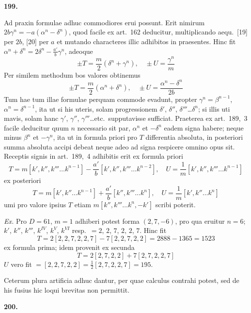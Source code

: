 \documentclass[12pt,a4paper]{article}
\theoremstyle{plain}
\begin{document}
\bigskip

\textbf{199.}

Ad praxin formulae adhuc commodiores erui possunt. Erit nimirum $2b\gamma^n = -a(\alpha^n - \delta^n)$, quod facile ex art.~162 deducitur, multiplicando aequ.~[19] per $2b$, [20] per $a$ et mutando characteres illic adhibitos in praesentes. Hinc fit $\alpha^n + \delta^n = 2\delta^n - \frac{a'}{b}\gamma^n$, adeoque
\[
\pm T = \frac{m}{2}(\delta^n + \gamma^n), \quad \pm U = \frac{\gamma^n}{m}
\]
Per similem methodum bos valores obtinemus
\[
\pm T = \frac{m}{2}(\alpha^n + \delta^n), \quad \pm U = \frac{\alpha^n - \delta^n}{2b}
\]
Tum hae tum illae formulae perquam commode evadunt, propter $\gamma^n = \beta^{n-1}$, $\alpha^n = \delta^{n-1}$, ita ut si his uteris, solam progressionem $\delta'$, $\delta''$, $\delta'''$\ldots$\delta^n$; si illis uti mavis, solam hanc $\gamma'$, $\gamma''$, $\gamma'''$\ldots etc.~supputavisse sufficiat. Praeterea ex art.~189,~3 facile deducitur quum $n$ necessario sit par, $\alpha^n$ et $-\delta^n$ eadem signa habere; neque minus $\beta^n$ et $-\gamma^n$, ita ut in formula priori pro $T$ differentia absoluta, in posteriori summa absoluta accipi debeat neque adeo ad signa respicere omnino opus sit. Receptis signis in art.~189,~4 adhibitis erit ex formula priori
\[
T = m[k', k'', k'''\ldots k^{n-1}] - \frac{a'}{b}[k', k'', k'''\ldots k^{n-2}], \quad U = \frac{1}{m}[k', k'', k'''\ldots k^{n-1}]
\]
ex posteriori
\[
T = m[k', k''\ldots k^{n-1}] + \frac{a'}{b}[k'', k'''\ldots k^n], \quad U = \frac{1}{m}[k', k''\ldots k^n]
\]
umi pro valore ipsius $T$ etiam $m[k'', k'''\ldots k^n, -k']$ scribi poterit.

\textit{Ex.} Pro $D = 61$, $m = 1$ adhiberi potest forma $(2, 7, -6)$, pro qua eruitur $n = 6$; $k'$, $k''$, $k'''$, $k^{IV}$, $k^V$, $k^{VI}$ resp.~$= 2$, $2$, $7$, $2$, $2$, $7$. Hinc fit
\[
T = 2[2, 2, 7, 2, 2, 7] - 7[2, 2, 7, 2, 2] = 2888 - 1365 = 1523
\]
ex formula prima; idem provenit ex secunda
\[
T = 2[2, 7, 2, 2] + 7[2, 7, 2, 2, 7]
\]
$U$ vero fit $= [2, 2, 7, 2, 2] = \frac{1}{2}[2, 7, 2, 2, 7] = 195$.

Ceterum plura artificia adhuc dantur, per quae calculus contrahi potest, sed de his fusius hic loqui brevitas non permittit.

\bigskip

\textbf{200.}
\end{document}
